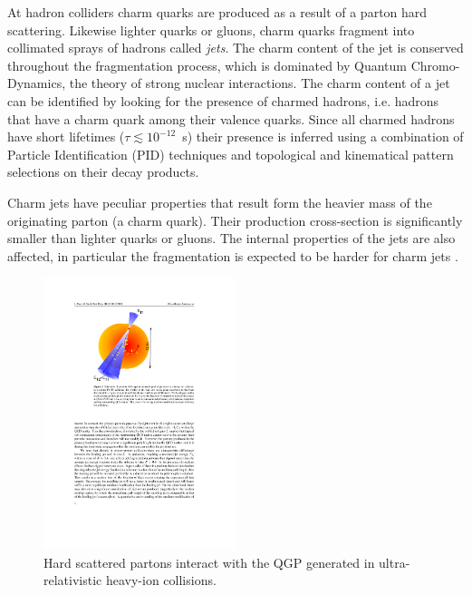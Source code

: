\documentclass[12pt, a4paper, twoside, titlepage]{article}
\begin{document}
At hadron colliders charm quarks are produced as a result of a parton hard scattering. Likewise lighter quarks or gluons, charm quarks
fragment into collimated sprays of hadrons called \emph{jets}. The charm content of the jet is conserved throughout the fragmentation process,
which is dominated by Quantum Chromo-Dynamics, the theory of strong nuclear interactions.
The charm content of a jet can be identified by looking for the presence of charmed hadrons, i.e. hadrons that have
a charm quark among their valence quarks. Since all charmed hadrons have short lifetimes ($\tau \lesssim 10^{-12}$~s) their presence is inferred
using a combination of Particle Identification (PID) techniques and topological and kinematical pattern selections on their decay products.

Charm jets have peculiar properties that result form the heavier mass of the originating parton (a charm quark).
Their production cross-section is significantly smaller than lighter quarks or gluons. The internal
properties of the jets are also affected, in particular the fragmentation is expected to be harder for charm jets .

\begin{figure}[tbh]
\begin{center}
\includegraphics[width=0.5\textwidth]{img/jetquenching}
 \caption{Hard scattered partons interact with the QGP generated in ultra-relativistic heavy-ion collisions.} 
 \label{fig:jetquenching}
\end{center}
\end{figure}
\end{document}
